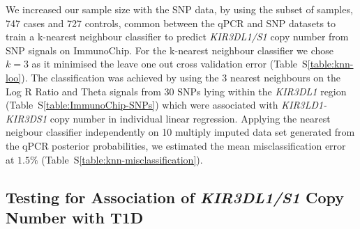 We increased our sample size with the SNP data,
by using the subset of samples, 747 cases and 727 controls, common between the qPCR and SNP datasets to train a k-nearest neighbour classifier
to predict \emph{KIR3DL1/S1} copy number from  SNP signals on ImmunoChip.
For the k-nearest neighbour classifier we chose $k=3$ as it minimised the leave one out cross validation error (Table~S\ref{table:knn-loo}).
The classification was achieved by using the 3 nearest neighbours on the Log R Ratio and Theta signals from 30 SNPs lying within the \emph{KIR3DL1} region (Table~S\ref{table:ImmunoChip-SNPs}) which were associated with \emph{KIR3LD1-KIR3DS1} copy number in individual linear regression.
Applying the nearest neigbour classifier independently on 10 multiply imputed data set generated from the qPCR posterior probabilities,
we estimated the mean misclassification error at $1.5\%$ (Table~S\ref{table:knn-misclassification}). 






\subsection{Testing for Association of \emph{KIR3DL1/S1} Copy Number with T1D}

